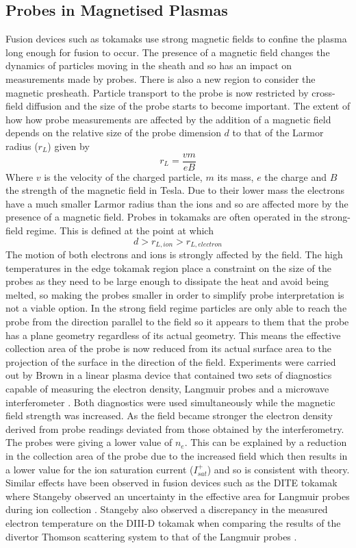 \documentclass[12pt]{article}
\def\be{\begin{equation}}
\def\ee{\end{equation}}
\begin{document}
\subsection{Probes in Magnetised Plasmas}
Fusion devices such as tokamaks use strong magnetic fields to confine the plasma long enough for fusion to occur. The presence of a magnetic field changes the dynamics of particles moving in the sheath and so has an impact on measurements made by probes. There is also a new region to consider the magnetic presheath. Particle transport to the probe is now restricted by cross-field diffusion and the size of the probe starts to become important. The extent of how how probe measurements are affected by the addition of a magnetic field depends on the relative size of the probe dimension $d$ to that of the Larmor radius ($r_L$) given by
\be 
r_L = \frac{v m}{e B}
\ee
Where $v$ is the velocity of the charged particle, $m$ its mass, $e$ the charge and $B$ the strength of the magnetic field in Tesla. Due to their lower mass the electrons have a much smaller Larmor radius than the ions and so are affected more by the presence of a magnetic field. Probes in tokamaks are often operated in the strong-field regime. This is defined at the point at which
\be
d > r_{L,ion} >  r_{L, electron}
\ee
The motion of both electrons and ions is strongly affected by the field. The high temperatures in the edge tokamak region place a constraint on the size of the probes as they need to be large enough to dissipate the heat and avoid being melted, so making the probes smaller in order to simplify probe interpretation is not a viable option.
In the strong field regime particles are only able to reach the probe from the direction parallel to the field so it appears to them that the probe has a plane geometry regardless of its actual geometry. This means the effective collection area of the probe is now reduced from its actual surface area to the projection of the surface in the direction of the field.  Experiments were carried out by Brown in a linear plasma device that contained two sets of diagnostics capable of measuring the electron density, Langmuir probes and a microwave interferometer \cite{probe-response}. Both diagnostics were used simultaneously while the magnetic field strength was increased. As the field became stronger the electron density derived from probe readings deviated from those obtained by the interferometry. The probes were giving a lower value of $n_e$. This can be explained by a reduction in the collection area of the probe due to the increased field which then results in a lower value for the ion saturation current ($I_{sat}^+$) and so is consistent with theory. Similar effects have been observed in fusion devices such as the DITE tokamak where Stangeby observed an uncertainty in the effective area for Langmuir probes during ion collection \cite{dite}. Stangeby also observed a discrepancy in the measured electron temperature on the DIII-D tokamak when comparing the results of the divertor Thomson scattering system to that of the Langmuir probes \cite{d3d}.
\end{document}
